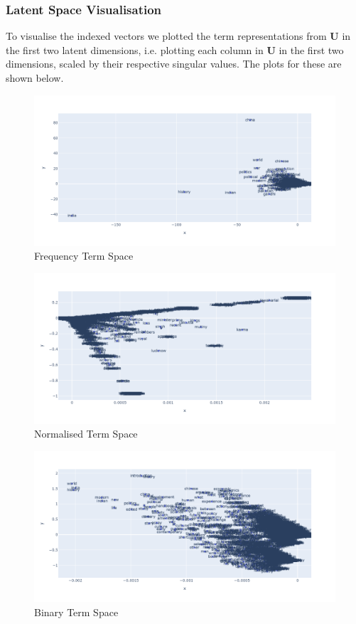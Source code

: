 \documentclass[article]{article}
\begin{document}
\subsubsection{Latent Space Visualisation}{
To visualise the indexed vectors we plotted the term representations from $\mathbf{U}$ in the first two latent dimensions, i.e. plotting each column in $\mathbf{U}$ in the first two dimensions, scaled by their respective singular values. The plots for these are shown below.

\begin{figure}[h]
    \centering
    \includegraphics[width=0.9\linewidth]{freq_term_space.png}
    \caption{Frequency Term Space}
    \label{fig:freqterms}
\end{figure}

\begin{figure}[h]
    \centering
    \includegraphics[width=0.9\linewidth]{norm_term_space.png}
    \caption{Normalised Term Space}
    \label{fig:normterms}
\end{figure}

\begin{figure}[h]
    \centering
    \includegraphics[width=0.9\linewidth]{bin_term_space.png}
    \caption{Binary Term Space}
    \label{fig:binterms}
\end{figure}
}
\end{document}
